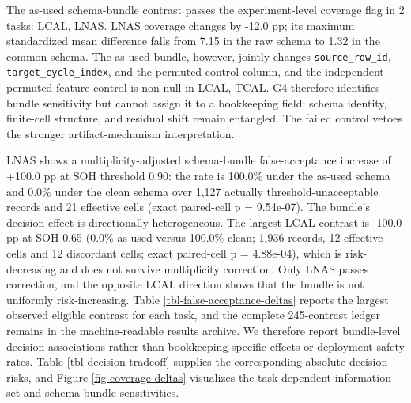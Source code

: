 \documentclass[
  number,
  preprint]{elsarticle}
\begin{document}
The as-used schema-bundle contrast passes the experiment-level coverage
flag in 2 tasks: LCAL, LNAS. LNAS coverage changes by -12.0 pp; its
maximum standardized mean difference falls from 7.15 in the raw schema
to 1.32 in the common schema. The as-used bundle, however, jointly
changes \texttt{source\_row\_id}, \texttt{target\_cycle\_index}, and the
permuted control column, and the independent permuted-feature control is
non-null in LCAL, TCAL. G4 therefore identifies bundle sensitivity but
cannot assign it to a bookkeeping field: schema identity, finite-cell
structure, and residual shift remain entangled. The failed control
vetoes the stronger artifact-mechanism interpretation.

LNAS shows a multiplicity-adjusted schema-bundle false-acceptance
increase of +100.0 pp at SOH threshold 0.90: the rate is 100.0\% under
the as-used schema and 0.0\% under the clean schema over 1,127 actually
threshold-unacceptable records and 21 effective cells (exact paired-cell
p = 9.54e-07). The bundle's decision effect is directionally
heterogeneous. The largest LCAL contrast is -100.0 pp at SOH 0.65 (0.0\%
as-used versus 100.0\% clean; 1,936 records, 12 effective cells and 12
discordant cells; exact paired-cell p = 4.88e-04), which is
risk-decreasing and does not survive multiplicity correction. Only LNAS
passes correction, and the opposite LCAL direction shows that the bundle
is not uniformly risk-increasing. Table
\ref{tbl-false-acceptance-deltas} reports the largest observed eligible
contrast for each task, and the complete 245-contrast ledger remains in
the machine-readable results archive. We therefore report bundle-level
decision associations rather than bookkeeping-specific effects or
deployment-safety rates. Table \ref{tbl-decision-tradeoff} supplies the
corresponding absolute decision risks, and Figure
\ref{fig-coverage-deltas} visualizes the task-dependent information-set
and schema-bundle sensitivities.
\end{document}
